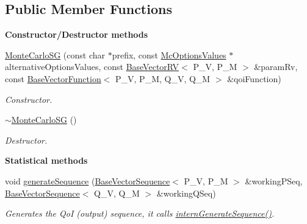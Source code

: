 \subsection*{Public Member Functions}
\begin{Indent}{\bf Constructor/\-Destructor methods}\par
\begin{DoxyCompactItemize}
\item 
\hyperlink{class_q_u_e_s_o_1_1_monte_carlo_s_g_a63ad585f5b20991e053a3400a866d2fa}{Monte\-Carlo\-S\-G} (const char $\ast$prefix, const \hyperlink{class_q_u_e_s_o_1_1_mc_options_values}{Mc\-Options\-Values} $\ast$alternative\-Options\-Values, const \hyperlink{class_q_u_e_s_o_1_1_base_vector_r_v}{Base\-Vector\-R\-V}$<$ P\-\_\-\-V, P\-\_\-\-M $>$ \&param\-Rv, const \hyperlink{class_q_u_e_s_o_1_1_base_vector_function}{Base\-Vector\-Function}$<$ P\-\_\-\-V, P\-\_\-\-M, Q\-\_\-\-V, Q\-\_\-\-M $>$ \&qoi\-Function)
\begin{DoxyCompactList}\small\item\em Constructor. \end{DoxyCompactList}\item 
\hyperlink{class_q_u_e_s_o_1_1_monte_carlo_s_g_a8a89772b3aaaafacfebb4b10ba431c70}{$\sim$\-Monte\-Carlo\-S\-G} ()
\begin{DoxyCompactList}\small\item\em Destructor. \end{DoxyCompactList}\end{DoxyCompactItemize}
\end{Indent}
\begin{Indent}{\bf Statistical methods}\par
\begin{DoxyCompactItemize}
\item 
void \hyperlink{class_q_u_e_s_o_1_1_monte_carlo_s_g_a879d33eee1d328b6a8f9bff3d909a400}{generate\-Sequence} (\hyperlink{class_q_u_e_s_o_1_1_base_vector_sequence}{Base\-Vector\-Sequence}$<$ P\-\_\-\-V, P\-\_\-\-M $>$ \&working\-P\-Seq, \hyperlink{class_q_u_e_s_o_1_1_base_vector_sequence}{Base\-Vector\-Sequence}$<$ Q\-\_\-\-V, Q\-\_\-\-M $>$ \&working\-Q\-Seq)
\begin{DoxyCompactList}\small\item\em Generates the Qo\-I (output) sequence, it calls \hyperlink{class_q_u_e_s_o_1_1_monte_carlo_s_g_ad0a5e608dd814fbc17237a267c6d5827}{intern\-Generate\-Sequence()}. \end{DoxyCompactList}\end{DoxyCompactItemize}
\end{Indent}
